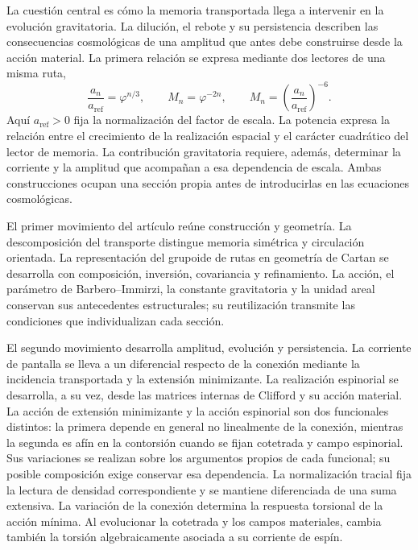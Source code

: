 La cuestión central es cómo la memoria transportada llega a intervenir
en la evolución gravitatoria. La dilución, el rebote y su persistencia
describen las consecuencias cosmológicas de una amplitud que antes debe
construirse desde la acción material. La primera relación se expresa
mediante dos lectores de una misma ruta,
\begin{equation}
 \frac{a_n}{a_{\mathrm{ref}}}=\varphi^{n/3},
 \qquad M_n=\varphi^{-2n},
 \qquad
 M_n=\left(\frac{a_n}{a_{\mathrm{ref}}}\right)^{-6}.
 \label{vii:eq:programa-dilucion}
\end{equation}
Aquí \(a_{\mathrm{ref}}>0\) fija la normalización del factor de escala.
La potencia expresa la relación entre el crecimiento de la realización
espacial y el carácter cuadrático del lector de memoria. La contribución
gravitatoria requiere, además, determinar la corriente y la amplitud que
acompañan a esa dependencia de escala. Ambas construcciones ocupan una
sección propia antes de introducirlas en las ecuaciones cosmológicas.

El primer movimiento del artículo reúne construcción y geometría. La
descomposición del transporte distingue memoria simétrica y circulación
orientada. La representación del grupoide de rutas en geometría de Cartan
se desarrolla con composición, inversión, covariancia y refinamiento. La
acción, el parámetro de Barbero--Immirzi, la constante gravitatoria y la
unidad areal conservan sus antecedentes estructurales; su reutilización
transmite las condiciones que individualizan cada sección.

El segundo movimiento desarrolla amplitud, evolución y persistencia.
La corriente de pantalla se lleva a un diferencial respecto de la
conexión mediante la incidencia transportada y la extensión minimizante.
La realización espinorial se desarrolla, a su vez, desde las matrices
internas de Clifford y su acción material. La acción de extensión
minimizante y la acción espinorial son dos funcionales distintos: la
primera depende en general no linealmente de la conexión, mientras la
segunda es afín en la contorsión cuando se fijan cotetrada y campo
espinorial. Sus variaciones se realizan sobre los argumentos propios de
cada funcional; su posible composición exige conservar esa dependencia.
La normalización tracial
fija la lectura de densidad correspondiente y se mantiene diferenciada de
una suma extensiva. La variación de la conexión determina la respuesta
torsional de la acción mínima. Al evolucionar la cotetrada y los campos
materiales, cambia también la torsión algebraicamente asociada a su
corriente de espín.

